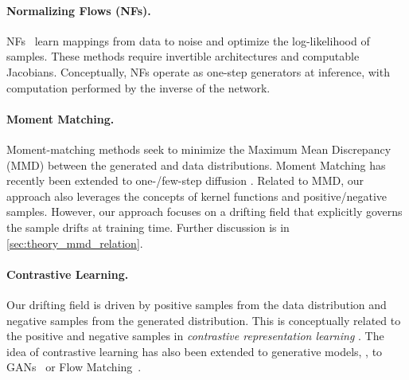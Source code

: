 \paragraph{Normalizing Flows (NFs).}
NFs~\cite{rezende2015variational,dinh2016density,zhai2024normalizing} learn mappings from data to noise and optimize the log-likelihood of samples.
These methods require invertible architectures and computable Jacobians. Conceptually, NFs operate as one-step generators at inference, with computation performed by the \mbox{inverse} of the network.

\paragraph{Moment Matching.} 
Moment-matching methods \cite{dziugaite2015training,li2015generative} seek to minimize the Maximum Mean Discrepancy (MMD) between the generated and data distributions.
Moment Matching has recently been extended to one-/few-step diffusion \cite{zhou2025inductive}.
Related to MMD, our approach also leverages the concepts of kernel functions and positive/negative samples. However, our approach focuses on a drifting field that explicitly governs the sample drifts at training time. Further discussion is in \ref{sec:theory_mmd_relation}.

\paragraph{Contrastive Learning.}
Our drifting field is driven by positive samples from the data distribution and negative samples from the generated distribution.
This is conceptually related to the positive and negative samples in \textit{contrastive representation learning} \cite{hadsell2006dimensionality,oord2018representation}.
The idea of contrastive learning has also been extended to generative models, \eg, to GANs~\cite{unterthiner2017coulomb,kang2020contragan} or Flow Matching~\cite{stoica2025contrastive}.